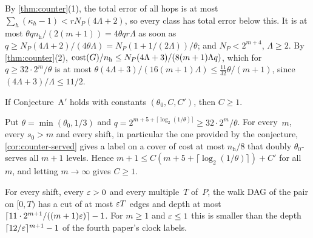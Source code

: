 \begin{informalproof}
By \cref{thm:counter}(1), the total error of all hops is at most $\sum_h(\kappa_h-1)<rN_P(4\Lambda+2)$, so every class has
total error below this. It is at most $\theta qn_{\mathrm h}/(2(m+1))=4\theta qr\Lambda$ as soon as
$q\ge N_P(4\Lambda+2)/(4\theta\Lambda)=N_P(1+1/(2\Lambda))/\theta$; and $N_P<2^{m+4}$, $\Lambda\ge2$. By
\cref{thm:counter}(2), $\mathrm{cost}(G)/n_{\mathrm h}\le N_P(4\Lambda+3)/(8(m+1)\Lambda q)$, which for $q\ge32\cdot2^m/\theta$ is
at most $\theta(4\Lambda+3)/(16(m+1)\Lambda)\le\frac{11}{32}\theta/(m+1)$, since $(4\Lambda+3)/\Lambda\le11/2$.
\end{informalproof}

\begin{corollary}\label{cor:C1}
\notformalized
If Conjecture~A$'$ holds with constants $(\theta_0,C,C')$, then $C\ge1$.
\end{corollary}

\begin{informalproof}
Put $\theta=\min(\theta_0,1/3)$ and $q=2^{m+5+\lceil\log_2(1/\theta)\rceil}\ge32\cdot2^m/\theta$. For every~$m$, every
$s_0>m$ and every shift, in particular the one provided by the conjecture, \cref{cor:counter-served} gives a label on a cover of
cost at most $n_{\mathrm h}/8$ that doubly $\theta_0$-serves all $m+1$ levels. Hence
$m+1\le C(m+5+\lceil\log_2(1/\theta)\rceil)+C'$ for all~$m$, and letting $m\to\infty$ gives $C\ge1$.
\end{informalproof}

\begin{corollary}\label{cor:counter-cut}
\notformalized
For every shift, every $\varepsilon>0$ and every multiple~$T$ of~$P$, the walk DAG of the pair on $[0,T)$ has a cut of at most
$\varepsilon T$ edges and depth at most $\lceil11\cdot2^{m+1}/((m+1)\varepsilon)\rceil-1$. For $m\ge1$ and $\varepsilon\le1$ this is smaller
than the depth $\lceil12/\varepsilon\rceil^{m+1}-1$ of the fourth paper's clock labels.
\end{corollary}

